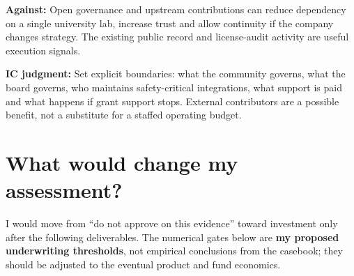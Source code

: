 \documentclass{article}
\begin{document}
\textbf{Against:} Open governance and upstream contributions can reduce
dependency on a single university lab, increase trust and allow
continuity if the company changes strategy. The existing public record
and license-audit activity are useful execution signals.

\textbf{IC judgment:} Set explicit boundaries: what the community
governs, what the board governs, who maintains safety-critical
integrations, what support is paid and what happens if grant support
stops. External contributors are a possible benefit, not a substitute
for a staffed operating budget.

\section{What would change my
assessment?}\label{what-would-change-my-assessment}

I would move from ``do not approve on this evidence'' toward investment
only after the following deliverables. The numerical gates below are
\textbf{my proposed underwriting thresholds}, not empirical conclusions
from the casebook; they should be adjusted to the eventual product and
fund economics.
\end{document}
